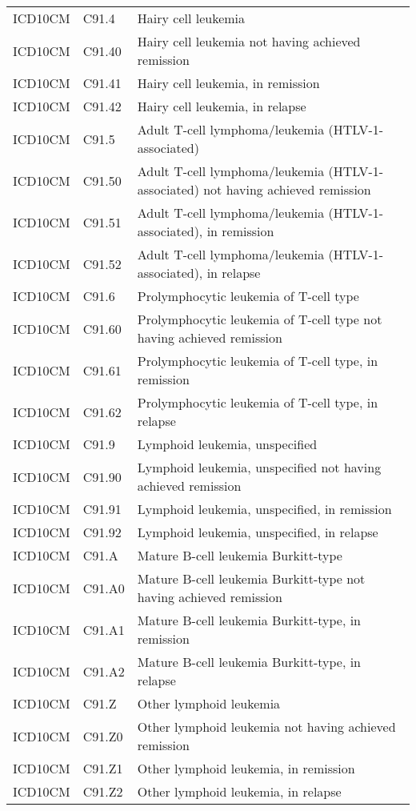 \begin{table}[ht]
\begin{tabular}{lll}
  ICD10CM & C91.4 & Hairy cell leukemia \\ 
  ICD10CM & C91.40 & Hairy cell leukemia not having achieved remission \\ 
  ICD10CM & C91.41 & Hairy cell leukemia, in remission \\ 
  ICD10CM & C91.42 & Hairy cell leukemia, in relapse \\ 
  ICD10CM & C91.5 & Adult T-cell lymphoma/leukemia (HTLV-1-associated) \\ 
  ICD10CM & C91.50 & Adult T-cell lymphoma/leukemia (HTLV-1-associated) not having achieved remission \\ 
  ICD10CM & C91.51 & Adult T-cell lymphoma/leukemia (HTLV-1-associated), in remission \\ 
  ICD10CM & C91.52 & Adult T-cell lymphoma/leukemia (HTLV-1-associated), in relapse \\ 
  ICD10CM & C91.6 & Prolymphocytic leukemia of T-cell type \\ 
  ICD10CM & C91.60 & Prolymphocytic leukemia of T-cell type not having achieved remission \\ 
  ICD10CM & C91.61 & Prolymphocytic leukemia of T-cell type, in remission \\ 
  ICD10CM & C91.62 & Prolymphocytic leukemia of T-cell type, in relapse \\ 
  ICD10CM & C91.9 & Lymphoid leukemia, unspecified \\ 
  ICD10CM & C91.90 & Lymphoid leukemia, unspecified not having achieved remission \\ 
  ICD10CM & C91.91 & Lymphoid leukemia, unspecified, in remission \\ 
  ICD10CM & C91.92 & Lymphoid leukemia, unspecified, in relapse \\ 
  ICD10CM & C91.A & Mature B-cell leukemia Burkitt-type \\ 
  ICD10CM & C91.A0 & Mature B-cell leukemia Burkitt-type not having achieved remission \\ 
  ICD10CM & C91.A1 & Mature B-cell leukemia Burkitt-type, in remission \\ 
  ICD10CM & C91.A2 & Mature B-cell leukemia Burkitt-type, in relapse \\ 
  ICD10CM & C91.Z & Other lymphoid leukemia \\ 
  ICD10CM & C91.Z0 & Other lymphoid leukemia not having achieved remission \\ 
  ICD10CM & C91.Z1 & Other lymphoid leukemia, in remission \\ 
  ICD10CM & C91.Z2 & Other lymphoid leukemia, in relapse \\ 

\end{tabular}
\end{table}
